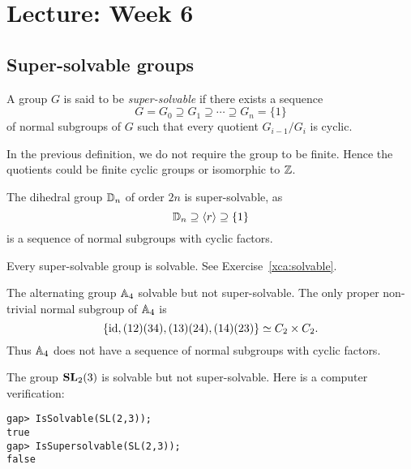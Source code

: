 \section{Lecture: Week 6}

\subsection{Super-solvable groups}

\begin{definition}
A group $G$ is said to be \emph{super-solvable} if there exists a sequence 
\[
G=G_0\supseteq G_1\supseteq\cdots\supseteq G_n=\{1\}
\]
of normal subgroups of $G$ such that every 
quotient $G_{i-1}/G_i$ is cyclic. 
\end{definition}

In the previous definition, we do not require the group to be finite. Hence the quotients 
could be finite cyclic groups or isomorphic to $\mathbb{Z}$. 

\begin{example}
The dihedral group $\mathbb{D}_{n}$ of order $2n$ is super-solvable, as 
\[	
\mathbb{D}_{n}\supseteq \langle
r\rangle\supseteq \{1\}
\]
is a sequence of normal subgroups with cyclic factors. 
\end{example}

Every super-solvable group is solvable. See Exercise~\ref{xca:solvable}.

\begin{example}
The alternating group $\mathbb{A}_4$ solvable but not super-solvable. The only 
proper non-trivial normal subgroup of $\mathbb{A}_4$ is 
	\[
	\{\operatorname{id},(12)(34),(13)(24),(14)(23)\}\simeq C_2\times C_2.
	\]
Thus $\mathbb{A}_4$ does not have a sequence of normal subgroups 
with cyclic factors. 
\end{example}


\begin{example}
The group $\mathbf{SL}_2(3)$ is solvable but not super-solvable. Here is a computer verification: 
\begin{lstlisting}
gap> IsSolvable(SL(2,3));
true
gap> IsSupersolvable(SL(2,3));
false
\end{lstlisting}
\end{example}

